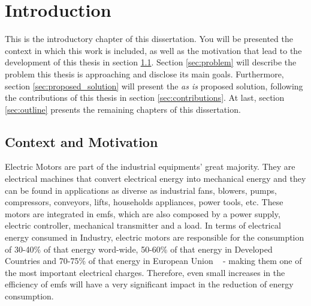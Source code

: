\newcommand{\unlthesis}{\emph{unlthesis}}
\newcommand{\unlthesisclass}{\texttt{unlthesis.cls}}

\chapter{Introduction}  
\label{cha:introduction} 

This is the introductory chapter of this dissertation. You will be presented the context in which this work is included, as well as the motivation that lead to the development of this thesis in section \ref{sec:motivation}. Section \ref{sec:problem} will describe the problem this thesis is approaching and disclose its main goals. Furthermore, section \ref{sec:proposed_solution} will present the \emph{as is} proposed solution, following the contributions of this thesis in section \ref{sec:contributions}. At last, section \ref{sec:outline} presents the remaining chapters of this dissertation.

\section{Context and Motivation} %
\label{sec:motivation}

Electric Motors are part of the industrial equipments' great majority. They are electrical machines that convert electrical energy into mechanical energy and they can be found in applications as diverse as industrial fans, blowers, pumps, compressors, conveyors, lifts, households appliances, power tools, etc. 
These motors are integrated in \acrfull{emfs}, which are also composed by a power supply, electric controller, mechanical transmitter and a load. 
In terms of electrical energy consumed in Industry, electric motors are responsible for the consumption of 30-40\% of that energy word-wide, 50-60\% of that energy in Developed Countries and 70-75\% of that energy in European Union ~\cite{Ferreira1} - making them one of the most important electrical charges. 
Therefore, even small increases in the efficiency of \acrshort{emfs} will have a very significant impact in the reduction of energy consumption.


